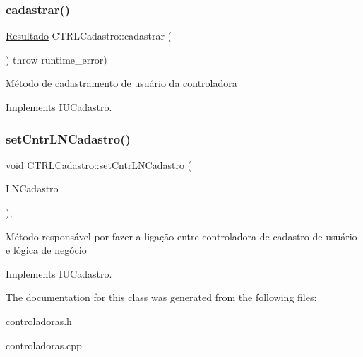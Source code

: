 \subsubsection{\texorpdfstring{cadastrar()}{cadastrar()}}
{\footnotesize\ttfamily \hyperlink{classResultado}{Resultado} C\+T\+R\+L\+Cadastro\+::cadastrar (\begin{DoxyParamCaption}{ }\end{DoxyParamCaption}) throw  runtime\+\_\+error) \hspace{0.3cm}{\ttfamily [virtual]}}

Método de cadastramento de usuário da controladora 

Implements \hyperlink{classIUCadastro}{I\+U\+Cadastro}.

\mbox{\label{classCTRLCadastro_aa9324e682be46537c44c2feb33e05991}} 
\subsubsection{\texorpdfstring{set\+Cntr\+L\+N\+Cadastro()}{setCntrLNCadastro()}}
{\footnotesize\ttfamily void C\+T\+R\+L\+Cadastro\+::set\+Cntr\+L\+N\+Cadastro (\begin{DoxyParamCaption}\item[{\hyperlink{classILNCadastro}{I\+L\+N\+Cadastro} $\ast$}]{L\+N\+Cadastro }\end{DoxyParamCaption})\hspace{0.3cm}{\ttfamily [inline]}, {\ttfamily [virtual]}}

Método responsável por fazer a ligação entre controladora de cadastro de usuário e lógica de negócio 

Implements \hyperlink{classIUCadastro}{I\+U\+Cadastro}.



The documentation for this class was generated from the following files\+:\begin{DoxyCompactItemize}
\item 
controladoras.\+h\item 
controladoras.\+cpp\end{DoxyCompactItemize}
